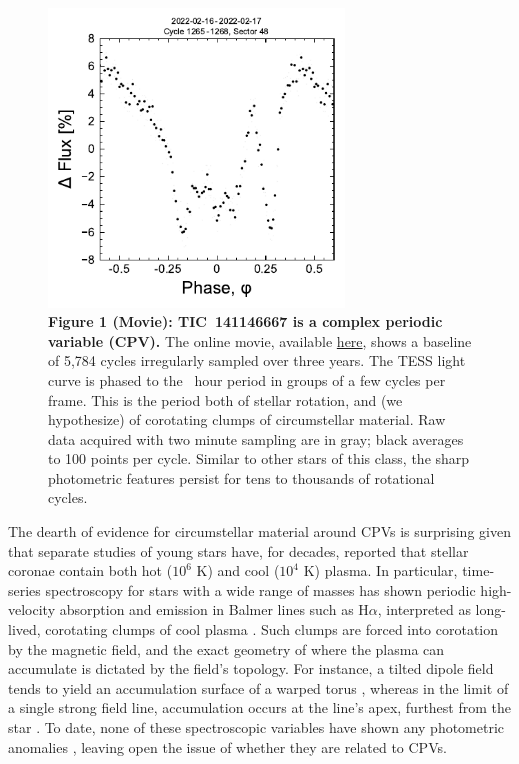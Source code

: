 \documentclass{nature3}
\begin{document}
\begin{figure}[!t]
  \centering
  \includegraphics[width=0.7\textwidth]{figures/f1.pdf}
  \captionsetup{labelformat=empty}
  \caption{{\bf Figure 1 (Movie):  TIC~141146667 is a complex periodic
  variable (CPV).}  The online movie,
  available
  \href{https://lgbouma.com/movies/TIC141146667_20250116.mp4}{here},
  shows a baseline of 5{,}784 cycles irregularly sampled over three
  years.  The TESS light curve is phased to the \periodhr\ hour period in
  groups of a few cycles per frame.  This is the period both of
  stellar rotation, and (we hypothesize) of corotating clumps of
  circumstellar material.  Raw data acquired with two minute sampling
  are in gray; black averages to 100 points per cycle.  Similar to
  other stars of this class, the sharp photometric features persist
  for tens to thousands of rotational cycles. }
  \label{fig:lc}
\end{figure}


The dearth of evidence for circumstellar material around CPVs is
surprising given that separate studies of young stars have, for
decades, reported that stellar coronae contain both hot ($10^6$ K) and
cool ($10^4$ K) plasma. In particular, time-series spectroscopy for
stars with a wide range of masses has shown periodic high-velocity
absorption and emission in Balmer lines such as H$\alpha$, interpreted
as long-lived, corotating clumps of cool plasma
\cite{CollierCameron1989,Donati2000,Dunstone2006,Skelly2008}.
Such clumps are forced into corotation by the magnetic field, and the
exact geometry of where the plasma can accumulate is dictated by the
field's topology.  For instance, a tilted dipole field tends
to yield an accumulation surface of a warped torus
\cite{Townsend2005}, whereas in the limit of a single strong field
line, accumulation occurs at the line's apex, furthest from the star
\cite{Waugh2022}.
To date, none of these spectroscopic variables have shown any
photometric anomalies \cite{Bouma2024}, leaving open the issue of
whether they are related to CPVs.
\end{document}
